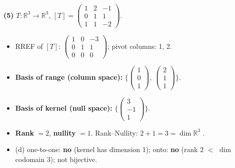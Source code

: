 \noindent\textbf{(5)} $T:\mathbb{R}^3\to\mathbb{R}^3$, $[T]=\begin{pmatrix}1 & 2 & -1 \\ 0 & 1 & 1 \\ 1 & 1 & -2\end{pmatrix}$.
\begin{itemize}
\item RREF of $[T]$: $\begin{pmatrix}1 & 0 & -3 \\ 0 & 1 & 1 \\ 0 & 0 & 0\end{pmatrix}$; pivot columns: 1, 2.
\item \textbf{Basis of range (column space):} $\Big\{\begin{pmatrix}1 \\ 0 \\ 1\end{pmatrix},\ \begin{pmatrix}2 \\ 1 \\ 1\end{pmatrix}\Big\}$.
\item \textbf{Basis of kernel (null space):} $\Big\{\begin{pmatrix}3 \\ -1 \\ 1\end{pmatrix}\Big\}$.
\item \textbf{Rank} $=2$, \textbf{nullity} $=1$. Rank--Nullity: $2+1=3=\dim\mathbb{R}^3$ \checkmark.
\item (d) one-to-one: \textbf{no} (kernel has dimension 1); onto: \textbf{no} (rank $2$ $<$ $\dim$ codomain $3$); not bijective.
\end{itemize}

